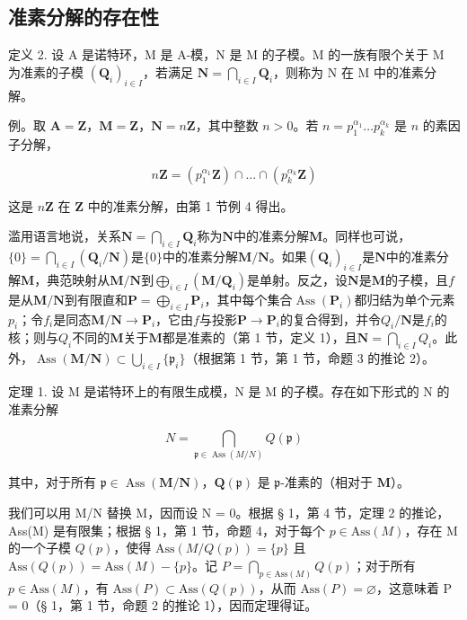 \subsection{准素分解的存在性}

定义 2. 设 A 是诺特环，M 是 A-模，N 是 M 的子模。M 的一族有限个关于 M 为准素的子模 \((\mathbf{Q}_i)_{i\in I}\)，若满足 \(\mathbf{N} = \bigcap_{i\in I}\mathbf{Q}_i\)，则称为 N 在 M 中的准素分解。

例。取 \(\mathbf{A} = \mathbf{Z}\)，\(\mathbf{M} = \mathbf{Z}\)，\(\mathbf{N} = n\mathbf{Z}\)，其中整数 \(n > 0\)。若 \(n = p_{1}^{\alpha_1} \ldots p_{k}^{\alpha_k}\) 是 \(n\) 的素因子分解，

\[
n \mathbf {Z} = (p _ {1} ^ {\alpha_ {1}} \mathbf {Z}) \cap \dots \cap (p _ {k} ^ {\alpha_ {k}} \mathbf {Z})
\]

这是 \(n\mathbf{Z}\) 在 \(\mathbf{Z}\) 中的准素分解，由第 1 节例 4 得出。

滥用语言地说，关系\(\mathbf{N} = \bigcap_{i \in I} \mathbf{Q}_i\)称为\(\mathbf{N}\)中的准素分解\(\mathbf{M}\)。同样也可说，\(\{0\} = \bigcap_{i \in I} (\mathbf{Q}_i / \mathbf{N})\)是\(\{0\}\)中的准素分解\(\mathbf{M} / \mathbf{N}\)。如果\((\mathbf{Q}_i)_{i \in I}\)是\(\mathbf{N}\)中的准素分解\(\mathbf{M}\)，典范映射从\(\mathbf{M} / \mathbf{N}\)到\(\bigoplus_{i \in I} (\mathbf{M} / \mathbf{Q}_i)\)是单射。反之，设\(\mathbf{N}\)是\(\mathbf{M}\)的子模，且\(f\)是从\(\mathbf{M} / \mathbf{N}\)到有限直和\(\mathbf{P} = \bigoplus_{i \in I} \mathbf{P}_i\)，其中每个集合\(\operatorname{Ass}(\mathbf{P}_i)\)都归结为单个元素\(p_i\)；令\(f_i\)是同态\(\mathbf{M} / \mathbf{N} \to \mathbf{P}_i\)，它由\(f\)与投影\(\mathbf{P} \to \mathbf{P}_i\)的复合得到，并令\(Q_i / \mathbf{N}\)是\(f_i\)的核；则与\(Q_i\)不同的\(\mathbf{M}\)关于\(\mathbf{M}\)都是准素的（第 1 节，定义 1），且\(\mathbf{N} = \bigcap_{i \in I} Q_i\)。此外，\(\operatorname{Ass}(\mathbf{M} / \mathbf{N}) \subset \bigcup_{i \in I} \{\mathfrak{p}_i\}\)（根据第 1 节，第 1 节，命题 3 的推论 2）。

定理 1. 设 M 是诺特环上的有限生成模，N 是 M 的子模。存在如下形式的 N 的准素分解

\[
N = \bigcap_ {\mathfrak {p} \in \operatorname{Ass} (M / N)} Q (\mathfrak {p})\tag{1}
\]

其中，对于所有 \(\mathfrak{p} \in \operatorname{Ass}(\mathbf{M} / \mathbf{N})\)，\(\mathbf{Q}(\mathfrak{p})\) 是 \(\mathfrak{p}\)-准素的（相对于 \(\mathbf{M}\)）。

我们可以用 M/N 替换 M，因而设 N = 0。根据 § 1，第 4 节，定理 2 的推论，Ass(M) 是有限集；根据 § 1，第 1 节，命题 4，对于每个 \(p \in \text{Ass}(M)\)，存在 M 的一个子模 \(Q(p)\)，使得 \(\text{Ass}(M/Q(p)) = \{p\}\) 且 \(\text{Ass}(Q(p)) = \text{Ass}(M) - \{p\}\)。记 \(P = \bigcap_{p \in \text{Ass}(M)} Q(p)\)；对于所有 \(p \in \text{Ass}(M)\)，有 \(\text{Ass}(P) \subset \text{Ass}(Q(p))\)，从而 \(\text{Ass}(P) = \varnothing\)，这意味着 P = 0（§ 1，第 1 节，命题 2 的推论 1），因而定理得证。

